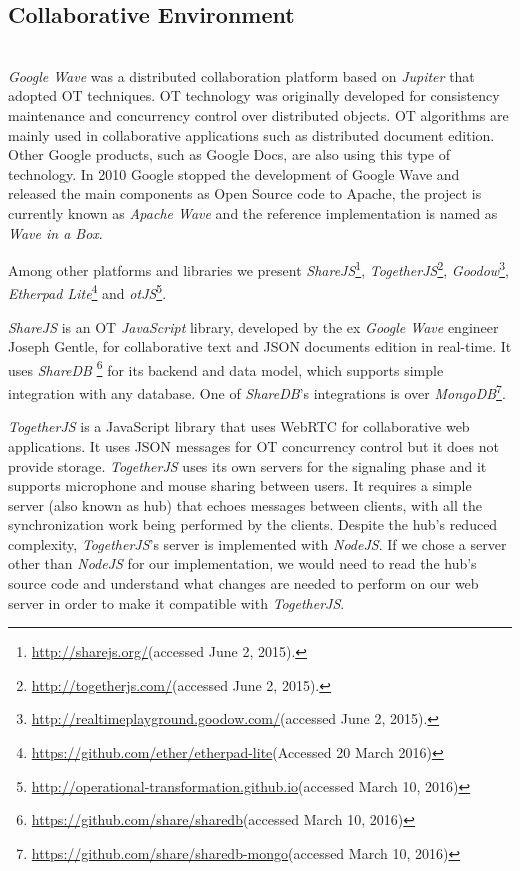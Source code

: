   \subsection{Collaborative Environment}\label{collabenv}~\\
	\emph{Google Wave} was a distributed collaboration platform based on \emph{Jupiter}\cite{jupiter} that adopted \ac{OT} techniques.
        \ac{OT} technology was originally developed for consistency maintenance and concurrency control over distributed objects.
        \ac{OT} algorithms are mainly used in collaborative applications such as distributed document edition.
    Other Google products, such as Google Docs, are also using this type of technology. In 2010 Google stopped the development of Google Wave and released the main components as Open Source code to Apache, the project is currently known as \emph{Apache Wave} and the reference implementation is named as \emph{Wave in a Box}.

    Among other platforms and libraries we present \emph{ShareJS}\footnote{\url{http://sharejs.org/}(accessed June 2, 2015).}, \emph{TogetherJS}\footnote{\url{http://togetherjs.com/}(accessed June 2, 2015).}, \emph{Goodow}\footnote{\url{http://realtimeplayground.goodow.com/}(accessed June 2, 2015).}, \emph{Etherpad Lite}\footnote{\url{https://github.com/ether/etherpad-lite}(Accessed 20 March 2016)} and \emph{otJS}\footnote{\url{http://operational-transformation.github.io}(accessed March 10, 2016)}.

	\emph{ShareJS} is an \ac{OT} \emph{JavaScript} library, developed by the ex \emph{Google Wave} engineer Joseph Gentle, for collaborative text and \ac{JSON} documents edition in real-time. It uses \emph{ShareDB} \footnote{\url{https://github.com/share/sharedb}(accessed March 10, 2016)} for its backend and data model, which supports simple integration with any database. One of \emph{ShareDB}'s integrations is over \emph{MongoDB}\footnote{\url{https://github.com/share/sharedb-mongo}(accessed March 10, 2016)}.

	\emph{TogetherJS} is a JavaScript library that uses \ac{WebRTC} for collaborative web applications. It uses \ac{JSON} messages for \ac{OT} concurrency control but it does not provide storage. \emph{TogetherJS} uses its own servers for the signaling phase and it supports microphone and mouse sharing between users. It requires a simple server (also known as hub) that echoes messages between clients, with all the synchronization work being performed by the clients. Despite the hub's reduced complexity, \emph{TogetherJS}'s server is implemented with \emph{NodeJS}. If we chose a server other than \emph{NodeJS} for our implementation, we would need to read the hub's source code and understand what changes are needed to perform on our web server in order to make it compatible with \emph{TogetherJS}.

